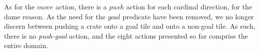 \documentclass[../Master.tex]{subfiles}
\begin{document}
As for the $move$ action, there is a $push$ action for each cardinal direction, for the dame reason. As the need for the $goal$ predicate have been removed, we no longer discern between pushing a crate onto a goal tile and onto a non-goal tile. As such, there is no \textit{push-goal} action, and the eight actions presented so far comprise the entire domain.
\end{document}
